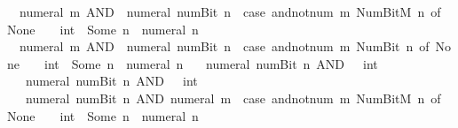 \begin{isabellebody}
\ \ {\isacartoucheopen}numeral\ m\ AND\ {\isacharminus}{\kern0pt}\ {\isacharparenleft}{\kern0pt}numeral\ {\isacharparenleft}{\kern0pt}num{\isachardot}{\kern0pt}Bit{}\ n{\isacharparenright}{\kern0pt}{\isacharparenright}{\kern0pt}\ {\isacharequal}{\kern0pt}\ {\isacharparenleft}{\kern0pt}case\ and{\isacharunderscore}{\kern0pt}not{\isacharunderscore}{\kern0pt}num\ m\ {\isacharparenleft}{\kern0pt}Num{\isachardot}{\kern0pt}BitM\ n{\isacharparenright}{\kern0pt}\ of\ None\ {\isasymRightarrow}\ {}\ {\isacharcolon}{\kern0pt}{\isacharcolon}{\kern0pt}\ int\ {\isacharbar}{\kern0pt}\ Some\ n{\isacharprime}{\kern0pt}\ {\isasymRightarrow}\ numeral\ n{\isacharprime}{\kern0pt}{\isacharparenright}{\kern0pt}{\isacartoucheclose}\isanewline
\ \ {\isacartoucheopen}numeral\ m\ AND\ {\isacharminus}{\kern0pt}\ {\isacharparenleft}{\kern0pt}numeral\ {\isacharparenleft}{\kern0pt}num{\isachardot}{\kern0pt}Bit{}\ n{\isacharparenright}{\kern0pt}{\isacharparenright}{\kern0pt}\ {\isacharequal}{\kern0pt}\ {\isacharparenleft}{\kern0pt}case\ and{\isacharunderscore}{\kern0pt}not{\isacharunderscore}{\kern0pt}num\ m\ {\isacharparenleft}{\kern0pt}Num{\isachardot}{\kern0pt}Bit{}\ n{\isacharparenright}{\kern0pt}\ of\ None\ {\isasymRightarrow}\ {}\ {\isacharcolon}{\kern0pt}{\isacharcolon}{\kern0pt}\ int\ {\isacharbar}{\kern0pt}\ Some\ n{\isacharprime}{\kern0pt}\ {\isasymRightarrow}\ numeral\ n{\isacharprime}{\kern0pt}{\isacharparenright}{\kern0pt}{\isacartoucheclose}\isanewline
\ \ {\isacartoucheopen}{\isacharminus}{\kern0pt}\ {\isacharparenleft}{\kern0pt}numeral\ {\isacharparenleft}{\kern0pt}num{\isachardot}{\kern0pt}Bit{}\ n{\isacharparenright}{\kern0pt}{\isacharparenright}{\kern0pt}\ AND\ {}\ {\isacharequal}{\kern0pt}\ {\isacharparenleft}{\kern0pt}{}{\isacharcolon}{\kern0pt}{\isacharcolon}{\kern0pt}int{\isacharparenright}{\kern0pt}{\isacartoucheclose}\isanewline
\ \ {\isacartoucheopen}{\isacharminus}{\kern0pt}\ {\isacharparenleft}{\kern0pt}numeral\ {\isacharparenleft}{\kern0pt}num{\isachardot}{\kern0pt}Bit{}\ n{\isacharparenright}{\kern0pt}{\isacharparenright}{\kern0pt}\ AND\ {}\ {\isacharequal}{\kern0pt}\ {\isacharparenleft}{\kern0pt}{}{\isacharcolon}{\kern0pt}{\isacharcolon}{\kern0pt}int{\isacharparenright}{\kern0pt}{\isacartoucheclose}\isanewline
\ \ {\isacartoucheopen}{\isacharminus}{\kern0pt}\ {\isacharparenleft}{\kern0pt}numeral\ {\isacharparenleft}{\kern0pt}num{\isachardot}{\kern0pt}Bit{}\ n{\isacharparenright}{\kern0pt}{\isacharparenright}{\kern0pt}\ AND\ numeral\ m\ {\isacharequal}{\kern0pt}\ {\isacharparenleft}{\kern0pt}case\ and{\isacharunderscore}{\kern0pt}not{\isacharunderscore}{\kern0pt}num\ m\ {\isacharparenleft}{\kern0pt}Num{\isachardot}{\kern0pt}BitM\ n{\isacharparenright}{\kern0pt}\ of\ None\ {\isasymRightarrow}\ {}\ {\isacharcolon}{\kern0pt}{\isacharcolon}{\kern0pt}\ int\ {\isacharbar}{\kern0pt}\ Some\ n{\isacharprime}{\kern0pt}\ {\isasymRightarrow}\ numeral\ n{\isacharprime}{\kern0pt}{\isacharparenright}{\kern0pt}{\isacartoucheclose}\isanewline

\end{isabellebody}
